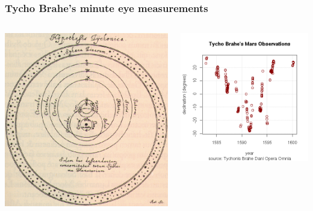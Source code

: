 \documentclass{beamer}
\begin{document}
\begin{frame}
  \frametitle{Tycho Brahe's minute eye measurements}
  \begin{columns}
    \begin{column}{0.5\textwidth}
      \includegraphics[width=\columnwidth]{figures/circular-orbits}
    \end{column}
    \begin{column}{0.5\textwidth}
      \includegraphics[width=\columnwidth]{figures/tycho-observations}

\end{column}
\end{columns}
\end{frame}
\end{document}
